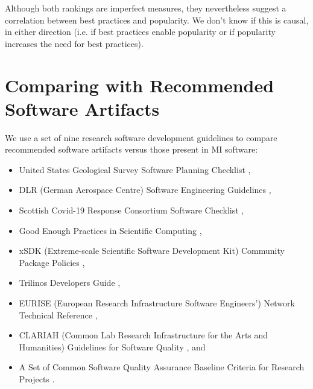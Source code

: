 \documentclass[doubleblind,12pt, 3p, times]{elsarticle}
\begin{document}
Although both rankings are imperfect measures, they nevertheless suggest a
correlation between best practices and popularity. We don't know if this is
causal, in either direction (i.e. if best practices enable popularity or if
popularity increases the need for best practices).

\section{Comparing with Recommended Software Artifacts} \label{Sec_CompareArtifacts}

We use a set of nine research software development
guidelines to compare recommended software artifacts versus those present in MI
software:
\begin{itemize}
\item United States Geological Survey Software Planning Checklist
\cite{USGS2019},
\item DLR (German Aerospace Centre) Software Engineering Guidelines
\cite{TobiasEtAl2018}, 
\item Scottish Covid-19 Response Consortium Software Checklist
\cite{BrettEtAl2021},
\item Good Enough Practices in Scientific Computing \cite{WilsonEtAl2016},
\item xSDK (Extreme-scale Scientific Software Development Kit) Community Package
Policies \cite{SmithAndRoscoe2018},
\item Trilinos Developers Guide \cite{HerouxEtAl2008},
\item EURISE (European Research Infrastructure Software Engineers') Network
Technical Reference \cite{ThielEtAl2020},
\item CLARIAH (Common Lab Research Infrastructure for the Arts and Humanities)
Guidelines for Software Quality \cite{vanGompelEtAl2016}, and
\item A Set of Common Software Quality Assurance Baseline Criteria for Research
Projects \cite{OrvizEtAl2017}.
\end{itemize}
\end{document}
